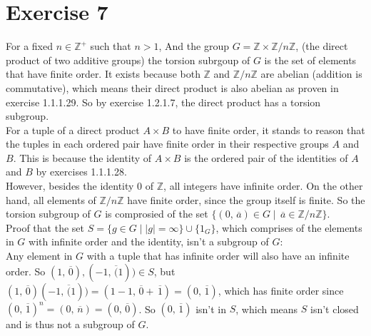 \documentclass[12pt]{article}
\newcommand{\Z}{\mathbb{Z}}
\newcommand{\olsi}[1]{\,\overline{\!{#1}}}
\begin{document}
    \section*{Exercise 7}
    For a fixed $n \in \Z^+$ such that $n > 1$,
    And the group $G = \Z \times \Z/n\Z$,
    (the direct product of two additive groups)
    the torsion subrgoup of $G$ is the set of elements that have finite
    order.
    It exists because both $\Z$ and $\Z/n\Z$ are abelian
    (addition is commutative),
    which means their direct product is also abelian
    as proven in exercise 1.1.1.29.
    So by exercise 1.2.1.7, the direct product has a torsion subgroup. \\
    For a tuple of a direct product $A \times B$ to have finite order,
    it stands to reason that the tuples in each ordered pair have finite
    order in their respective groups $A$ and $B$.
    This is because the identity of $A \times B$ is the ordered
    pair of the identities of $A$ and $B$ by exercises 1.1.1.28. \\
    However, besides the identity 0 of $\Z$, all integers have infinite
    order.
    On the other hand, all elements of $\Z/n\Z$ have finite order,
    since the group itself is finite.
    So the torsion subgroup of $G$ is comprosied of the set
    $\{(0, \olsi{a}) \in G \mid \olsi{a} \in \Z/n\Z \}$. \\
    Proof that the set $S = \{g \in G \mid |g| = \infty\} \cup \{1_G\}$,
    which comprises of the elements in $G$ with infinite order 
    and the identity, isn't a subgroup of $G$: \\
    Any element in $G$ with a tuple that has infinite order
    will also have an infinite order.
    So $(1, \olsi{0}), (-1, \olsi(1)) \in S$,
    but $(1, \olsi{0})(-1, \olsi(1)) = (1 - 1, \olsi{0} + \olsi{1})
    = (0, \olsi{1})$,
    which has finite order
    since $(0, \olsi{1})^n = (0, \olsi{n}) = (0, \olsi{0})$.
    So $(0, \olsi{1})$ isn't in $S$,
    which means $S$ isn't closed
    and is thus not a subgroup of $G$.
\end{document}
